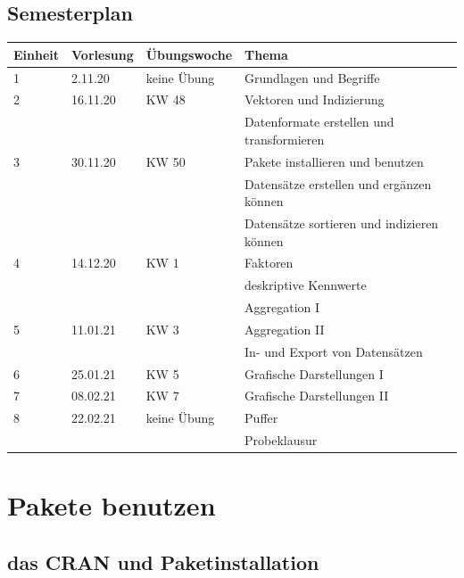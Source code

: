 \documentclass[
]{book}
\begin{document}
\hypertarget{semesterplan-3}{%
\subsection{Semesterplan}\label{semesterplan-3}}

\begin{table}[H]
\centering\begingroup\fontsize{15}{17}\selectfont

\begin{tabular}{l|l|l|l}
\hline
Einheit & Vorlesung & Übungswoche & Thema\\
\hline
1 & 2.11.20 & keine Übung & Grundlagen und Begriffe\\
\hline
2 & 16.11.20 & KW 48 & Vektoren und Indizierung\\
\hline
 &  &  & Datenformate erstellen und transformieren\\
\hline
3 & 30.11.20 & KW 50 & Pakete installieren und benutzen\\
\hline
 &  &  & Datensätze erstellen und ergänzen können\\
\hline
 &  &  & Datensätze sortieren und indizieren können\\
\hline
4 & 14.12.20 & KW 1 & Faktoren\\
\hline
 &  &  & deskriptive Kennwerte\\
\hline
 &  &  & Aggregation I\\
\hline
5 & 11.01.21 & KW 3 & Aggregation II\\
\hline
 &  &  & In- und Export von Datensätzen\\
\hline
6 & 25.01.21 & KW 5 & Grafische Darstellungen I\\
\hline
7 & 08.02.21 & KW 7 & Grafische Darstellungen II\\
\hline
8 & 22.02.21 & keine Übung & Puffer\\
\hline
 &  &  & Probeklausur\\
\hline
\end{tabular}
\endgroup{}
\end{table}

\hypertarget{pakete-benutzen}{%
\section{Pakete benutzen}\label{pakete-benutzen}}

\hypertarget{das-cran-und-paketinstallation}{%
\subsection{das CRAN und Paketinstallation}\label{das-cran-und-paketinstallation}}
\end{document}
